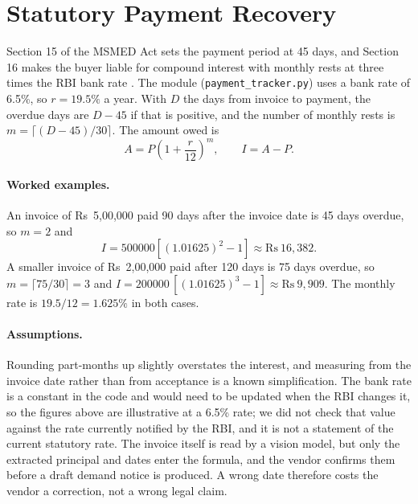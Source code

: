 \section{Statutory Payment Recovery}
\label{sec:payment}
Section 15 of the MSMED Act sets the payment period at 45 days, and Section 16 makes the buyer liable for compound interest with monthly rests at three times the RBI bank rate \cite{msmedact2006}. The module (\texttt{payment\_tracker.py}) uses a bank rate of 6.5\%, so $r=19.5\%$ a year. With $D$ the days from invoice to payment, the overdue days are $D-45$ if that is positive, and the number of monthly rests is $m=\lceil (D-45)/30\rceil$. The amount owed is
\begin{equation}
A=P\left(1+\frac{r}{12}\right)^{m},\qquad I=A-P.
\end{equation}

\paragraph{Worked examples.} An invoice of Rs~5{,}00{,}000 paid 90 days after the invoice date is 45 days overdue, so $m=2$ and
\begin{equation}
I=500000\left[(1.01625)^2-1\right]\approx \text{Rs}~16{,}382.
\end{equation}
A smaller invoice of Rs~2{,}00{,}000 paid after 120 days is 75 days overdue, so $m=\lceil 75/30\rceil=3$ and $I=200000\,[(1.01625)^3-1]\approx\text{Rs}~9{,}909$. The monthly rate is $19.5/12=1.625\%$ in both cases.

\paragraph{Assumptions.} Rounding part-months up slightly overstates the interest, and measuring from the invoice date rather than from acceptance is a known simplification. The bank rate is a constant in the code and would need to be updated when the RBI changes it, so the figures above are illustrative at a 6.5\% rate; we did not check that value against the rate currently notified by the RBI, and it is not a statement of the current statutory rate. The invoice itself is read by a vision model, but only the extracted principal and dates enter the formula, and the vendor confirms them before a draft demand notice is produced. A wrong date therefore costs the vendor a correction, not a wrong legal claim.

